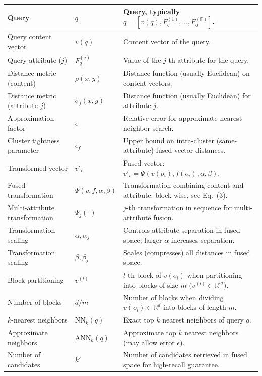 \documentclass[numbers,sort]{article}
\begin{document}
\begin{longtable}{p{3.5cm} p{1.5cm} p{7.8cm}}
\midrule
Query & $q$ & Query, typically $q = [v(q), F^{(1)}_q, ..., F^{(\mathbb{F})}_q]$. \\
\midrule
Query content vector & $v(q)$ & Content vector of the query. \\
\midrule
Query attribute ($j$) & $F^{(j)}_q$ & Value of the $j$-th attribute for the query. \\
\midrule
Distance metric (content) & $\rho(x, y)$ & Distance function (usually Euclidean) on content vectors. \\
\midrule
Distance metric (attribute $j$) & $\sigma_j(x, y)$ & Distance function (usually Euclidean) for attribute $j$. \\
\midrule
Approximation factor & $\epsilon$ & Relative error for approximate nearest neighbor search. \\
\midrule
Cluster tightness parameter & $\epsilon_f$ & Upper bound on intra-cluster (same-attribute) fused vector distances. \\
\midrule
Transformed vector & $v'_i$ & Fused vector: $v'_i = \Psi(v(o_i), f(o_i), \alpha, \beta)$. \\
\midrule
Fused transformation & $\Psi(v, f, \alpha, \beta)$ & Transformation combining content and attribute: block-wise, see Eq.~(3). \\
\midrule
Multi-attribute transformation & $\Psi_j(\cdot)$ & $j$-th transformation in sequence for multi-attribute fusion. \\
\midrule
Transformation scaling & $\alpha, \alpha_j$ & Controls attribute separation in fused space; larger $\alpha$ increases separation. \\
\midrule
Transformation scaling & $\beta, \beta_j$ & Scales (compresses) all distances in fused space. \\
\midrule
Block partitioning & $v^{(l)}$ & $l$-th block of $v(o_i)$ when partitioning into blocks of size $m$ ($v^{(l)} \in \mathbb{R}^m$). \\
\midrule
Number of blocks & $d/m$ & Number of blocks when dividing $v(o_i)\in\mathbb{R}^d$ into blocks of length $m$. \\
\midrule
$k$-nearest neighbors & $\mathrm{NN}_k(q)$ & Exact top $k$ nearest neighbors of query $q$. \\
\midrule
Approximate neighbors & $\mathrm{ANN}_k(q)$ & Approximate top $k$ nearest neighbors (may allow error $\epsilon$). \\
\midrule
Number of candidates & $k'$ & Number of candidates retrieved in fused space for high-recall guarantee. \\

\end{longtable}
\end{document}
